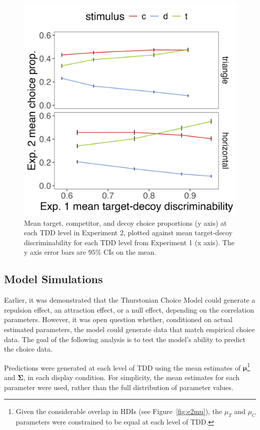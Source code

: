 \begin{figure}
   \includegraphics[width=\textwidth]{figures/choicePhase_att_trials_compare_to_2afc_collapsed.jpeg}
   \caption{Mean target, competitor, and decoy choice proportions (y axis) at each TDD level in Experiment 2, plotted against mean target-decoy discriminability for each TDD level from Experiment 1 (x axis). The y axis error bars are $95\%$ CIs on the mean.}
   \label{fig:e2_choice_compare_to_2afc}
\end{figure}

\subsection{Model Simulations}
Earlier, it was demonstrated that the Thurstonian Choice Model could generate a repulsion effect, an attraction effect, or a null effect, depending on the correlation parameters. However, it was open question whether, conditioned on actual estimated parameters, the model could generate data that match empirical choice data. The goal of the following analysis is to test the model's ability to predict the choice data. 

Predictions were generated at each level of TDD using the mean estimates of $\boldsymbol{\mu}$\footnote{Given the considerable overlap in HDIs (see Figure~\ref{fig:e2mu}), the $\mu_{T}$ and $\mu_{C}$ parameters were constrained to be equal at each level of TDD. } and $\boldsymbol{\Sigma}$, in each display condition. For simplicity, the mean estimates for each parameter were used, rather than the full distribution of parameter values.

